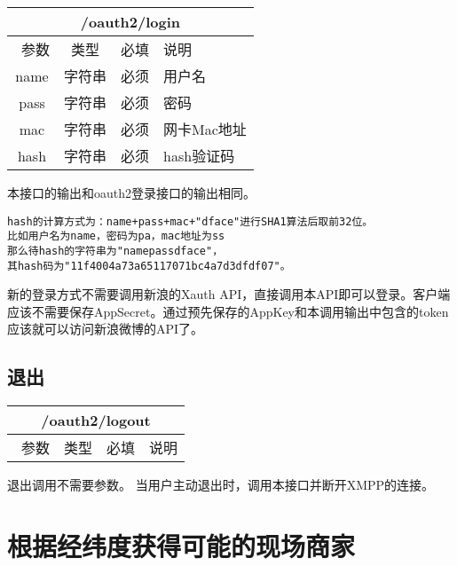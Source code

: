 \documentclass[cs4size]{ctexartutf8}
\begin{document}
\begin{table}[H]
   \begin{center}
\begin{tabular}{|c|c|c|p{12cm}|}
\hline
\multicolumn{4}{|c|}{/oauth2/login} \\
\hline\hline
 \  参数  & 类型 & 必填 &  说明  \\
\hline
 name  & 字符串 & 必须 &  用户名\\
 \hline
 pass  & 字符串 & 必须 &  密码\\
  \hline
 mac  & 字符串 & 必须 &  网卡Mac地址\\
 \hline
 hash  & 字符串 & 必须 &  hash验证码\\
\hline
\end{tabular}
   \end{center}
\end{table}

本接口的输出和oauth2登录接口的输出相同。

\begin{verbatim}
hash的计算方式为：name+pass+mac+"dface"进行SHA1算法后取前32位。
比如用户名为name，密码为pa，mac地址为ss
那么待hash的字符串为"namepassdface"，
其hash码为"11f4004a73a65117071bc4a7d3dfdf07"。
\end{verbatim}

新的登录方式不需要调用新浪的Xauth API，直接调用本API即可以登录。客户端应该不需要保存AppSecret。通过预先保存的AppKey和本调用输出中包含的token应该就可以访问新浪微博的API了。



\subsection{退出}

\begin{table}[H]
   \begin{center}
\begin{tabular}{|c|c|c|p{12cm}|}
\hline
\multicolumn{4}{|c|}{/oauth2/logout} \\
\hline\hline
 \  参数  & 类型 & 必填 &  说明  \\
\hline
\end{tabular}
   \end{center}
\end{table}

退出调用不需要参数。
当用户主动退出时，调用本接口并断开XMPP的连接。


\section{根据经纬度获得可能的现场商家}
\end{document}
